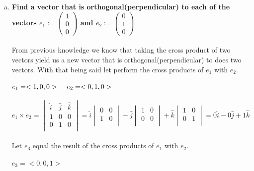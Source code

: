 \documentclass{article}
\begin{document}
\begin{enumerate}[b.]
\item\textbf{Find a vector that is orthogonal(perpendicular) to each of the vectors $e_{1}:= \left(\!
    \begin{array}{c}
      1 \\
      0 \\
      0
    \end{array}
  \!\right)$ and $e_{2}:=\left(\!
    \begin{array}{c}
      0 \\
      1 \\
      0
    \end{array}
  \!\right)$}
  \\
  \\
  From previous knowledge we know that taking the cross product of two vectors yield us a new vector that is orthogonal(perpendicular) to does two vectors. With that being said let perform the cross products of $e_{1}$ with $e_{2}$.
\\\\
$e_{1}=<1,0,0>\hspace{.4cm}e_{2}=<0,1,0>$\\
\\
$e_{1} \times e_{2}=\begin{vmatrix}
\hat{i}&\hat{j}&\hat{k}\\
1&0&0\\
0&1&0\\
\end{vmatrix}=\hat{i}\begin{vmatrix}
0&0\\
1&0\\
\end{vmatrix}-\hat{j}\begin{vmatrix}
1&0\\
0&0\\
\end{vmatrix}+\hat{k}\begin{vmatrix}
1&0\\
0&1\\
\end{vmatrix}=0\hat{i}-0\hat{j}+1\hat{k}$\\
\\
Let $e_{3}$ equal the result of the cross  products of $e_{1}$ with $e_{2}$.\\
\\
$e_{3}=<0,0,1>$
\end{enumerate}
\end{document}
